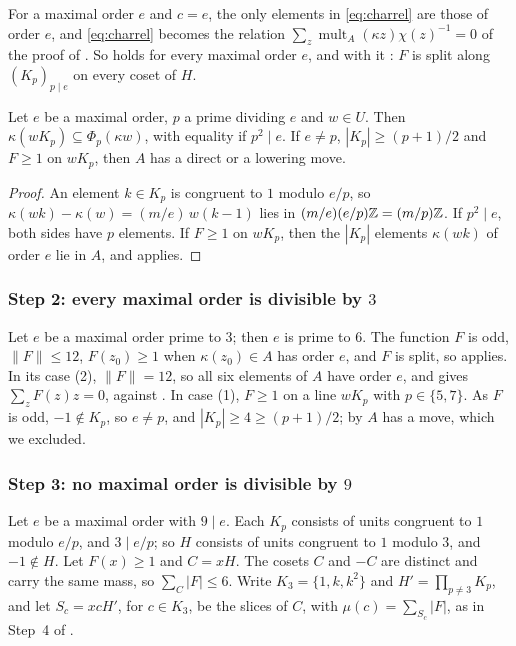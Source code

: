 For a maximal order $e$ and $c=e$, the only elements in \eqref{eq:charrel}
are those of order $e$, and \eqref{eq:charrel} becomes the relation
$\sum_{z}\operatorname{mult}_{A}(\kappa z)\chi(z)^{-1}=0$ of the proof of
. So  holds for every maximal order
$e$, and with it : $F$ is split along $(K_{p})_{p\mid e}$ on
every coset of $H$.

\begin{lemma}\label{lem:fiberline}
Let $e$ be a maximal order, $p$ a prime dividing $e$ and $w\in U$. Then
$\kappa(wK_{p})\subseteq\Phi_{p}(\kappa w)$, with equality if $p^{2}\mid e$.
If $e\ne p$, $|K_{p}|\ge(p+1)/2$ and $F\ge1$ on $wK_{p}$, then $A$ has a
direct or a lowering move.
\end{lemma}

\begin{proof}
An element $k\in K_{p}$ is congruent to $1$ modulo $e/p$, so
$\kappa(wk)-\kappa(w)=(m/e)\,w(k-1)$ lies in $(m/e)(e/p)\mathbb{Z}=(m/p)\mathbb{Z}$. If
$p^{2}\mid e$, both sides have $p$ elements. If $F\ge1$ on $wK_{p}$, then the
$|K_{p}|$ elements $\kappa(wk)$ of order $e$ lie in $A$, and
 applies.
\end{proof}

\subsubsection*{Step 2: every maximal order is divisible by \texorpdfstring{$3$}{3}}
Let $e$ be a maximal order prime to $3$; then $e$ is prime to $6$. The
function $F$ is odd, $\|F\|\le12$, $F(z_{0})\ge1$ when $\kappa(z_{0})\in A$
has order $e$, and $F$ is split, so  applies. In its case
(2), $\|F\|=12$, so all six elements of $A$ have order $e$, and
 gives $\sum_{z}F(z)z=0$, against . In
case (1), $F\ge1$ on a line $wK_{p}$ with $p\in\{5,7\}$. As $F$ is odd,
$-1\notin K_{p}$, so $e\ne p$, and $|K_{p}|\ge4\ge(p+1)/2$; by
 $A$ has a move, which we excluded.

\subsubsection*{Step 3: no maximal order is divisible by \texorpdfstring{$9$}{9}}
Let $e$ be a maximal order with $9\mid e$. Each $K_{p}$ consists of units
congruent to $1$ modulo $e/p$, and $3\mid e/p$; so $H$ consists of units
congruent to $1$ modulo $3$, and $-1\notin H$. Let $F(x)\ge1$ and $C=xH$. The
cosets $C$ and $-C$ are distinct and carry the same mass, so
$\sum_{C}|F|\le6$. Write $K_{3}=\{1,k,k^{2}\}$ and $H'=\prod_{p\ne3}K_{p}$,
and let $S_{c}=xcH'$, for $c\in K_{3}$, be the slices of $C$, with
$\mu(c)=\sum_{S_{c}}|F|$, as in Step~4 of .


